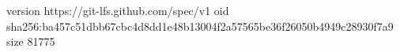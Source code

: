 version https://git-lfs.github.com/spec/v1
oid sha256:ba457c51dbb67cbc4d8dd1e48b13004f2a57565be36f26050b4949c28930f7a9
size 81775
